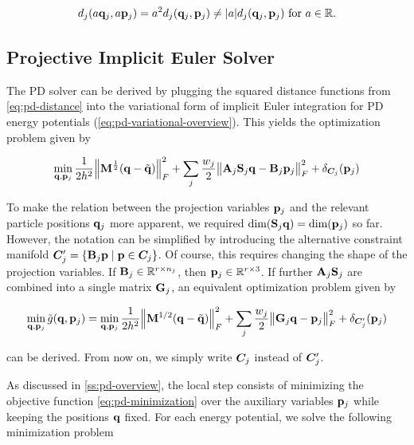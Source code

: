 \[
    d_j(a\mathbf{q}_j, a\mathbf{p}_j) = a^2d_j(\mathbf{q}_j, \mathbf{p}_j) \neq \vert a \vert d_j(\mathbf{q}_j, \mathbf{p}_j) \text{ for } 
    a \in \mathbb{R}. 
\]


\subsection{Projective Implicit Euler Solver}\label{ss:pd-solver}
The PD solver can be derived by plugging the squared distance functions from \autoref{eq:pd-distance} into the variational 
form of implicit
Euler integration for PD energy potentials (\cref{eq:pd-variational-overview}). This yields the optimization problem given by 

\begin{equation}\label{eq:pd-variational}
    \min_{\mathbf{q}, \mathbf{p}_j} \frac{1}{2h^2} \norm{\mathbf{M}^{\frac{1}{2}}(\mathbf{q} - \tilde{\mathbf{q}})}^2_F + 
    \sum_j \frac{w_j}{2} \norm{\mathbf{A}_j\mathbf{S}_j\mathbf{q} - \mathbf{B}_j\mathbf{p}_j}^2_F + \delta_{\bm{C}_j}(\mathbf{p}_j)
\end{equation}

\noindent To make the relation between the projection variables $\mathbf{p}_j$ and the relevant particle positions 
$\mathbf{q}_j$ more apparent, we required $\text{dim}(\mathbf{S}_j\mathbf{q}) = \text{dim}(\mathbf{p}_j)$ so far. However, the 
notation can be simplified by introducing the alternative constraint manifold $\bm{C}^\prime_j = \{ \mathbf{B}_j\mathbf{p} 
\mid \mathbf{p} \in \bm{C}_j \}$. Of course, this requires changing the shape of the projection variables. If 
$\mathbf{B}_j \in \mathbb{R}^{r \times n_j}$, then $\mathbf{p}_j \in \mathbb{R}^{r \times 3}$. If further $\mathbf{A}_j\mathbf{S}_j$ 
are combined into a single matrix $\mathbf{G}_j$, an equivalent optimization problem given by 

\begin{equation}\label{eq:pd-minimization}
    \min_{\mathbf{q}, \mathbf{p}_j} \tilde{g}(\mathbf{q}, \mathbf{p}_j) = 
    \min_{\mathbf{q}, \mathbf{p}_j} \frac{1}{2h^2} \norm{\mathbf{M}^{1/2}(\mathbf{q} - \tilde{\mathbf{q}})}^2_F + \sum_j \frac{w_j}{2} \norm{\mathbf{G}_j\mathbf{q}
    - \mathbf{p}_j}^2_F + \delta_{\bm{C}^\prime_j}(\mathbf{p}_j)
\end{equation}

\noindent can be derived. From now on, we simply write $\bm{C}_j$ instead of $\bm{C}^\prime_j$.

As discussed in \cref{ss:pd-overview}, the local step consists of minimizing the objective function 
\autoref{eq:pd-minimization} over the auxiliary variables $\mathbf{p}_j$ while keeping the positions $\mathbf{q}$ fixed. For each 
energy potential, we solve the following minimization problem

